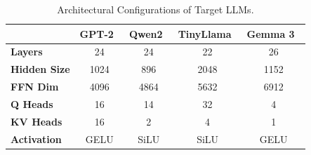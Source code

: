 \documentclass[9pt,conference]{IEEEtran}
\begin{document}
\begin{table}[t]
\centering
\caption{Architectural Configurations of Target LLMs.}
\label{tab:target_models}
\footnotesize
\renewcommand{\arraystretch}{0.80}
\setlength{\aboverulesep}{0.25ex}
\setlength{\belowrulesep}{0.25ex}
\setlength{\tabcolsep}{2pt}
\begin{tabular*}{\columnwidth}{@{\extracolsep{\fill}}lcccc@{}}
\toprule
& \textbf{GPT-2~\cite{gpt2}}
& \textbf{Qwen2~\cite{qwen2}}
& \textbf{TinyLlama~\cite{tinyllama}}
& \textbf{Gemma 3~\cite{gemma3}} \\
\midrule
\textbf{Layers}     & 24   & 24   & 22   & 26   \\
\midrule
\textbf{Hidden Size}& 1024 & 896  & 2048 & 1152 \\
\midrule
\textbf{FFN Dim}    & 4096 & 4864 & 5632 & 6912 \\
\midrule
\textbf{Q Heads}    & 16   & 14   & 32   & 4    \\
\midrule
\textbf{KV Heads}   & 16   & 2    & 4    & 1    \\
\midrule
\textbf{Activation} & GELU & SiLU & SiLU & GELU \\
\bottomrule
\end{tabular*}
\vspace{-9pt}
\end{table}
\end{document}
